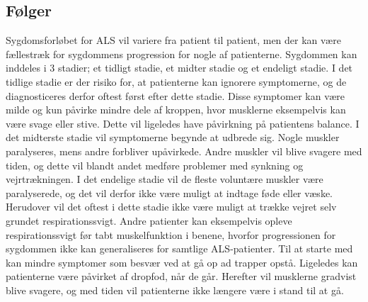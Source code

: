 \subsection{Følger}

Sygdomsforløbet for ALS vil variere fra patient til patient, men der kan være fællestræk for sygdommens progression for nogle af patienterne. Sygdommen kan inddeles i 3 stadier; et tidligt stadie, et midter stadie og et endeligt stadie. I det tidlige stadie er der risiko for, at patienterne kan ignorere symptomerne, og de diagnosticeres derfor oftest først efter dette stadie.\citep{themusculardystrophyassociation2016} Disse symptomer kan være milde og kun påvirke mindre dele af kroppen, hvor musklerne eksempelvis kan være svage eller stive. Dette vil ligeledes have påvirkning på patientens balance. I det midterste stadie vil symptomerne begynde at udbrede sig. Nogle muskler paralyseres, mens andre forbliver upåvirkede. Andre muskler vil blive svagere med tiden, og dette vil blandt andet medføre problemer med synkning og vejrtrækningen. I det endelige stadie vil de fleste voluntære muskler være paralyserede, og det vil derfor ikke være muligt at indtage føde eller væske. Herudover vil det oftest i dette stadie ikke være muligt at trække vejret selv grundet respirationssvigt. \citep{themusculardystrophyassociation2016} Andre patienter kan eksempelvis opleve respirationssvigt før tabt muskelfunktion i benene, hvorfor progressionen for sygdommen ikke kan generaliseres for samtlige ALS-patienter. Til at starte med kan mindre symptomer som besvær ved at gå op ad trapper opstå. Ligeledes kan patienterne være påvirket af dropfod, når de går. Herefter vil musklerne gradvist blive svagere, og med tiden vil patienterne ikke længere være i stand til at gå.\citep{tidy2015} 


